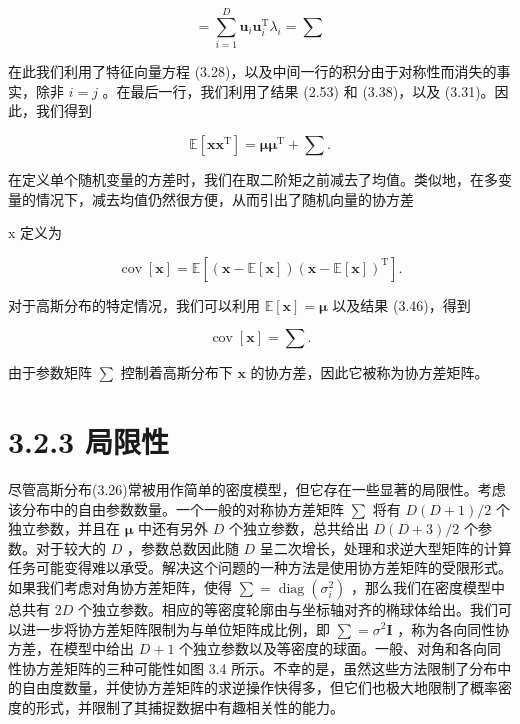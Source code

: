 \documentclass[10pt]{article}
\begin{document}
\[
= \mathop{\sum }\limits_{{i = 1}}^{D}{\mathbf{u}}_{i}{\mathbf{u}}_{i}^{\mathrm{T}}{\lambda }_{i} = \mathbf{\sum } \tag{3.45}
\]

在此我们利用了特征向量方程 (3.28)，以及中间一行的积分由于对称性而消失的事实，除非 \(i = j\) 。在最后一行，我们利用了结果 (2.53) 和 (3.38)，以及 (3.31)。因此，我们得到

\[
\mathbb{E}\left\lbrack  {\mathbf{x}{\mathbf{x}}^{\mathrm{T}}}\right\rbrack   = \mathbf{\mu }{\mathbf{\mu }}^{\mathrm{T}} + \mathbf{\sum }. \tag{3.46}
\]

在定义单个随机变量的方差时，我们在取二阶矩之前减去了均值。类似地，在多变量的情况下，减去均值仍然很方便，从而引出了随机向量的协方差

\(\mathrm{x}\) 定义为

\[
\operatorname{cov}\left\lbrack  \mathbf{x}\right\rbrack   = \mathbb{E}\left\lbrack  {\left( {\mathbf{x} - \mathbb{E}\left\lbrack  \mathbf{x}\right\rbrack  }\right) {\left( \mathbf{x} - \mathbb{E}\left\lbrack  \mathbf{x}\right\rbrack  \right) }^{\mathrm{T}}}\right\rbrack  . \tag{3.47}
\]

对于高斯分布的特定情况，我们可以利用 \(\mathbb{E}\left\lbrack  \mathbf{x}\right\rbrack   = \mathbf{\mu }\) 以及结果 (3.46)，得到

\[
\operatorname{cov}\left\lbrack  \mathbf{x}\right\rbrack   = \mathbf{\sum }. \tag{3.48}
\]

由于参数矩阵 \(\mathbf{\sum }\) 控制着高斯分布下 \(\mathbf{x}\) 的协方差，因此它被称为协方差矩阵。

\section*{3.2.3 局限性}

尽管高斯分布(3.26)常被用作简单的密度模型，但它存在一些显著的局限性。考虑该分布中的自由参数数量。一个一般的对称协方差矩阵 \(\mathbf{\sum }\) 将有 \(D\left( {D + 1}\right) /2\) 个独立参数，并且在 \(\mathbf{\mu }\) 中还有另外 \(D\) 个独立参数，总共给出 \(D\left( {D + 3}\right) /2\) 个参数。对于较大的 \(D\) ，参数总数因此随 \(D\) 呈二次增长，处理和求逆大型矩阵的计算任务可能变得难以承受。解决这个问题的一种方法是使用协方差矩阵的受限形式。如果我们考虑对角协方差矩阵，使得 \(\mathbf{\sum } = \operatorname{diag}\left( {\sigma }_{i}^{2}\right)\) ，那么我们在密度模型中总共有 \({2D}\) 个独立参数。相应的等密度轮廓由与坐标轴对齐的椭球体给出。我们可以进一步将协方差矩阵限制为与单位矩阵成比例，即 \(\mathbf{\sum } = {\sigma }^{2}\mathbf{I}\) ，称为各向同性协方差，在模型中给出 \(D + 1\) 个独立参数以及等密度的球面。一般、对角和各向同性协方差矩阵的三种可能性如图 3.4 所示。不幸的是，虽然这些方法限制了分布中的自由度数量，并使协方差矩阵的求逆操作快得多，但它们也极大地限制了概率密度的形式，并限制了其捕捉数据中有趣相关性的能力。
\end{document}
